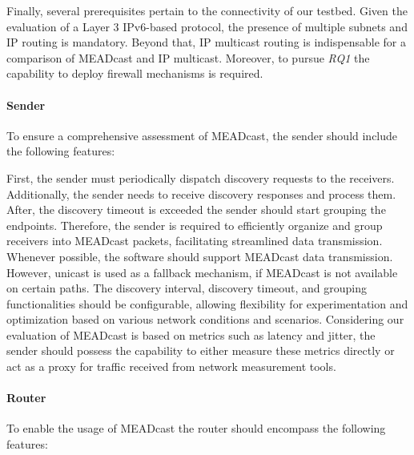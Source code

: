 Finally, several prerequisites pertain to the connectivity of our testbed.
Given the evaluation of a Layer 3 IPv6-based protocol, the presence of multiple
    subnets and IP routing is mandatory.
Beyond that, IP multicast routing is indispensable for a comparison of MEADcast
    and IP multicast.
Moreover, to pursue \textit{RQ1} the capability to deploy firewall mechanisms
    is required.

\paragraph{Sender} %
\label{par:Sender}
To ensure a comprehensive assessment of MEADcast, the sender should include the
    following features:

First, the sender must periodically dispatch discovery requests to the
    receivers.
Additionally, the sender needs to receive discovery responses and process them.
After, the discovery timeout is exceeded the sender should start grouping the
    endpoints.
Therefore, the sender is required to efficiently organize and group receivers
    into MEADcast packets, facilitating streamlined data transmission.
Whenever possible, the software should support MEADcast data transmission.
However, unicast is used as a fallback mechanism, if MEADcast is not available
    on certain paths.
The discovery interval, discovery timeout, and grouping functionalities should
    be configurable, allowing flexibility for experimentation and optimization
    based on various network conditions and scenarios.
Considering our evaluation of MEADcast is based on metrics such as latency and
    jitter, the sender should possess the capability to either measure these
    metrics directly or act as a proxy for traffic received from network
    measurement tools.

\paragraph{Router} %
\label{par:Router}
To enable the usage of MEADcast the router should encompass the following
    features:

